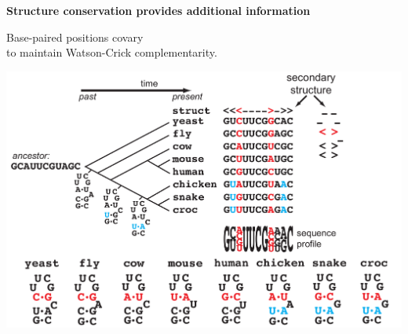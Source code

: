 \documentclass[landscape]{slides}
\begin{document}

\begin{slide}
\begin{center}
\textbf{Structure conservation provides additional information}
\medskip

Base-paired positions covary \\ to maintain Watson-Crick complementarity.

\includegraphics[width=9in]{figs/seqstructprofiles-struct2}
\end{center}

\vfill
\end{slide}
\end{document}

